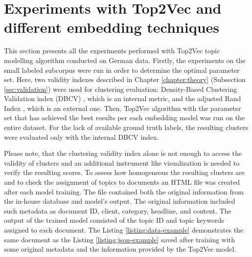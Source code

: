 \documentclass[fontsize=12pt,a4paper,twoside,openany]{scrbook}
\begin{document}
\section{Experiments with Top2Vec and different embedding techniques}
\label{sec:exp}

This section presents all the experiments performed with Top2Vec topic modelling algorithm conducted on German data. Firstly, the experiments on the small labeled subcorpus were run in order to determine the optimal parameter set. Here, two validity indexes described in Chapter \ref{chapter:theory} (Subsection \ref{sec:validation}) were used for clustering evaluation: Density-Based Clustering Validation index (DBCV) \parencite{Moulavi14}, which is an internal metric, and the adjusted Rand Index \parencite{Hubert85}, which is an external one. Then, Top2Vec algorithm with the parameter set that has achieved the best results per each embedding model was run on the entire dataset. For the lack of available ground truth labels, the resulting clusters were evaluated only with the internal DBCV index.

Please note, that the clustering validity index alone is not enough to access the validity of clusters and an additional instrument like visualization is needed \parencite{Halkidi01b} to verify the resulting scores. To assess how homogeneous the resulting clusters are and to check the assignment of topics to documents an HTML file was created after each model training. The file contained both the original information from the in-house database and model's output. The original information included such metadata as document ID, client, category, headline, and content. The output of the trained model consisted of the topic ID and topic keywords assigned to each document. The Listing \ref{listing:data-example} demonstrates the same document as the Listing \ref{listing:json-example} saved after training with some original metadata and the information provided by the Top2Vec model.
\end{document}
